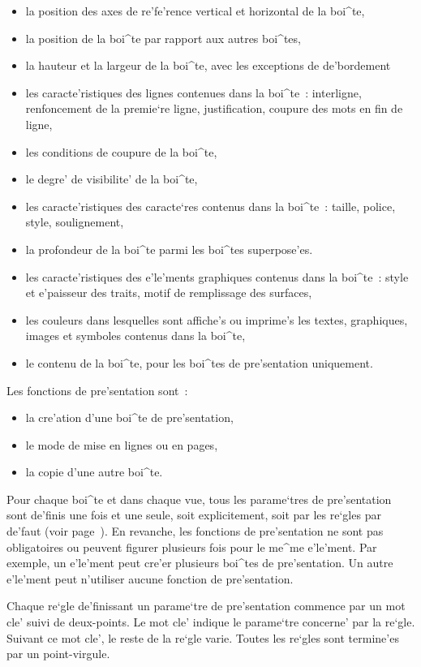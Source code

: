 {\begin{itemize}
\item la position des axes de re'fe'rence vertical et horizontal de la boi^te,
\item la position de la boi^te par rapport aux autres boi^tes,
\item la hauteur et la largeur de la boi^te, avec les exceptions de de'bordement
\item les caracte'ristiques des lignes contenues dans la boi^te~: interligne,
    renfoncement de la premie`re ligne, justification, coupure des mots en fin
    de ligne,
\item les conditions de coupure de la boi^te,
\item le degre' de visibilite' de la boi^te,
\item les caracte'ristiques des caracte`res contenus dans la boi^te~: taille,
    police, style, soulignement,
\item la profondeur de la boi^te parmi les boi^tes superpose'es.
\item les caracte'ristiques des e'le'ments graphiques contenus dans la boi^te~:
    style et e'paisseur des traits, motif de remplissage des surfaces,
\item les couleurs dans lesquelles sont affiche's ou imprime's les textes,
    graphiques, images et symboles contenus dans la boi^te,
\item le contenu de la boi^te, pour les boi^tes de pre'sentation uniquement.
\end{itemize}
Les fonctions de pre'sentation sont~:
\label{fonctpres}

\begin{itemize}
\item la cre'ation d'une boi^te de pre'sentation,
\item le mode de mise en lignes ou en pages,
\item la copie d'une autre boi^te.
\end{itemize}

Pour chaque boi^te et dans chaque vue, tous les parame`tres de pre'sentation
sont de'finis une fois et une seule, soit explicitement, soit par les re`gles
par de'faut (voir page~\pageref{reglesdefaut}). En revanche, les fonctions
de pre'sentation ne sont pas
obligatoires ou peuvent figurer plusieurs fois pour le me^me e'le'ment.
Par exemple, un e'le'ment peut cre'er plusieurs boi^tes de pre'sentation.
Un autre e'le'ment peut n'utiliser aucune fonction de pre'sentation.

Chaque re`gle de'finissant un parame`tre de pre'sentation commence par un
mot cle' suivi de deux-points. Le mot cle' indique le parame`tre concerne' par
la re`gle. Suivant ce mot cle', le reste de la re`gle varie. Toutes
les re`gles sont termine'es par un point-virgule.

}
